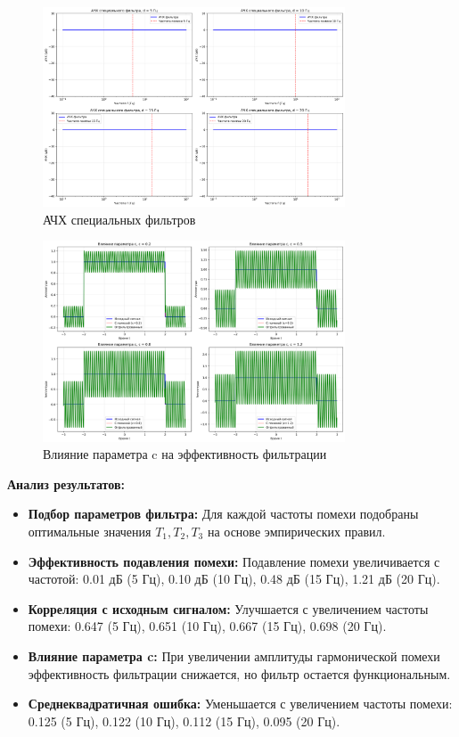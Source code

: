 \begin{figure}[H]
    \centering
    \includegraphics[width=0.8\textwidth]{images/task2/special_filter_frequency_response.png}
    \caption{АЧХ специальных фильтров}
    \label{fig:special_filter_freq_response}
\end{figure}

\begin{figure}[H]
    \centering
    \includegraphics[width=0.8\textwidth]{images/task2/special_filter_c_influence.png}
    \caption{Влияние параметра c на эффективность фильтрации}
    \label{fig:special_filter_c_influence}
\end{figure}

\textbf{Анализ результатов:}
\begin{itemize}
    \item \textbf{Подбор параметров фильтра:} Для каждой частоты помехи подобраны оптимальные значения $T_1, T_2, T_3$ на основе эмпирических правил.
    
    \item \textbf{Эффективность подавления помехи:} Подавление помехи увеличивается с частотой: 0.01 дБ (5 Гц), 0.10 дБ (10 Гц), 0.48 дБ (15 Гц), 1.21 дБ (20 Гц).
    
    \item \textbf{Корреляция с исходным сигналом:} Улучшается с увеличением частоты помехи: 0.647 (5 Гц), 0.651 (10 Гц), 0.667 (15 Гц), 0.698 (20 Гц).
    
    \item \textbf{Влияние параметра c:} При увеличении амплитуды гармонической помехи эффективность фильтрации снижается, но фильтр остается функциональным.
    
    \item \textbf{Среднеквадратичная ошибка:} Уменьшается с увеличением частоты помехи: 0.125 (5 Гц), 0.122 (10 Гц), 0.112 (15 Гц), 0.095 (20 Гц).
\end{itemize}

